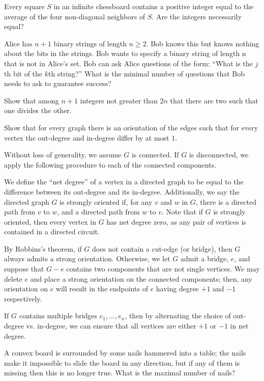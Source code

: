 \documentclass[10pt]{mypackage}
\begin{document}
\RaggedRight
\begin{problem}[Problem 1]
  Every square $S$ in an infinite chessboard contains a positive integer equal to the average of the four non-diagonal neighbors of $S$. Are the integers necessarily equal?
\end{problem}
\begin{problem}[Problem 2]
  Alice has $n+1$ binary strings of length $n\geq 2$. Bob knows this but knows nothing about the bits in the strings. Bob wants to specify a binary string of length n that is not in Alice’s set. Bob can ask Alice questions of the form: ``What is the $j$th bit of the $k$th string?'' What is the minimal number of questions that Bob needs to ask to guarantee success?
\end{problem}
\begin{problem}[Problem 3]
  Show that among $n+1$ integers not greater than $2n$ that there are two such that one divides the other.
\end{problem}
\begin{problem}[Problem 4]
Show that for every graph there is an orientation of the edges such that for every vertex the out-degree and in-degree differ by at most $1$.
\end{problem}
\begin{solution}
  Without loss of generality, we assume $G$ is connected. If $G$ is disconnected, we apply the following procedure to each of the connected components.\newline

  We define the ``net degree'' of a vertex in a directed graph to be equal to the difference between its out-degree and its in-degree. Additionally, we say the directed graph $G$ is strongly oriented if, for any $v$ and $w$ in $G$, there is a directed path from $v$ to $w$, and a directed path from $w$ to $v$. Note that if $G$ is strongly oriented, then every vertex in $G$ has net degree zero, as any pair of vertices is contained in a directed circuit.\newline

  By Robbins's theorem, if $G$ does not contain a cut-edge (or bridge), then $G$ always admits a strong orientation. Otherwise, we let $G$ admit a bridge, $e$, and suppose that $G - e$ contains two components that are not single vertices. We may delete $e$ and place a strong orientation on the connected components; then, any orientation on $e$ will result in the endpoints of $e$ having degree $+1$ and $-1$ respectively.\newline

  If $G$ contains multiple bridges $e_1,\dots,e_n$, then by alternating the choice of out-degree vs. in-degree, we can ensure that all vertices are either $+1$ or $-1$ in net degree.
\end{solution}

\begin{problem}[Problem 5]
  A convex board is surrounded by some nails hammered into a table; the nails make it impossible to slide the board in any direction, but if any of them is missing then this is no longer true. What is the maximal number of nails?
\end{problem}
\end{document}
